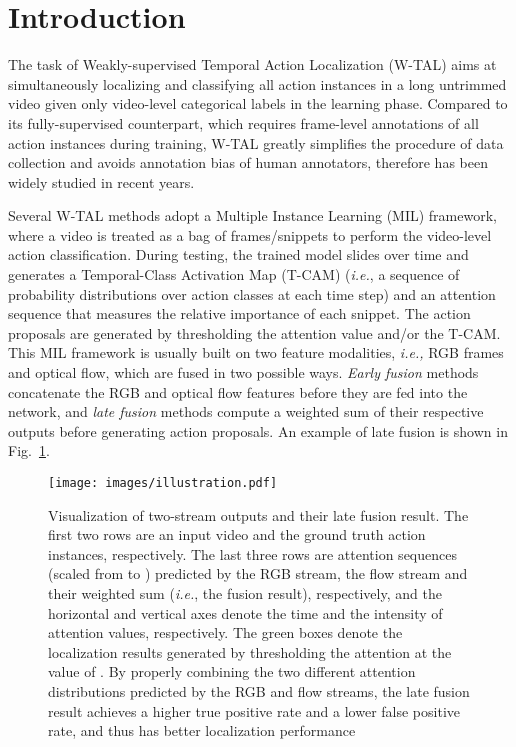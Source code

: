 \documentclass[runningheads]{llncs}
\begin{document}
\section{Introduction}
The task of Weakly-supervised Temporal Action Localization (W-TAL) aims at simultaneously localizing and classifying all action instances in a long untrimmed video given only video-level categorical labels in the learning phase. Compared to its fully-supervised counterpart, which requires frame-level annotations of all action instances during training, W-TAL greatly simplifies the procedure of data collection and avoids annotation bias of human annotators, therefore has been widely studied \cite{kumar2017hide,wang2017untrimmednets,shou2018autoloc,nguyen2018weakly,paul2018w,alwassel2019refineloc,liu2019completeness,zhai2019action,liu2019weakly,nguyen2019weakly,narayan20193c,yu2019temporal,lee2020background} in recent years.


Several W-TAL methods \cite{wang2017untrimmednets,paul2018w,nguyen2018weakly,liu2019completeness,nguyen2019weakly,narayan20193c,lee2020background} adopt a Multiple Instance Learning (MIL) framework, where a video is treated as a bag of frames/snippets to perform the video-level action classification. During testing, the trained model slides over time and generates a Temporal-Class Activation Map (T-CAM) \cite{zhou2016learning,nguyen2018weakly} (\textit{i.e.}, a sequence of probability distributions over action classes at each time step) and an attention sequence that measures the relative importance of each snippet. 
The action proposals are generated by thresholding the attention value and/or the T-CAM.
This MIL framework is usually built on two feature modalities, \textit{i.e.,} RGB frames and optical flow, which are fused in two possible ways. \textit{Early fusion} methods \cite{paul2018w,shou2018autoloc,alwassel2019refineloc,liu2019completeness,liu2019weakly,lee2020background} concatenate the RGB and optical flow features before they are fed into the network, and \textit{late fusion} methods \cite{nguyen2018weakly,liu2019completeness,nguyen2019weakly,narayan20193c} compute a weighted sum of their respective outputs before generating action proposals. An example of late fusion is shown in Fig.~\ref{fig:twoStream}.

\begin{figure}[t]
	\centering
	\texttt{[image: images/illustration.pdf]}
	\caption{Visualization of two-stream outputs and their late fusion result. The first two rows are an input video and the ground truth action instances, respectively. The last three rows are attention sequences (scaled from  to ) predicted by the RGB stream, the flow stream and their weighted sum (\textit{i.e.}, the fusion result), respectively, and the horizontal and vertical axes denote the time and the intensity of attention values, respectively.
	The green boxes denote the localization results generated by thresholding the attention at the value of . By properly combining the two different attention distributions predicted by the RGB and flow streams, the late fusion result achieves a higher true positive rate and a lower false positive rate, and thus has better localization performance}
	\label{fig:twoStream}
\end{figure}
\end{document}
